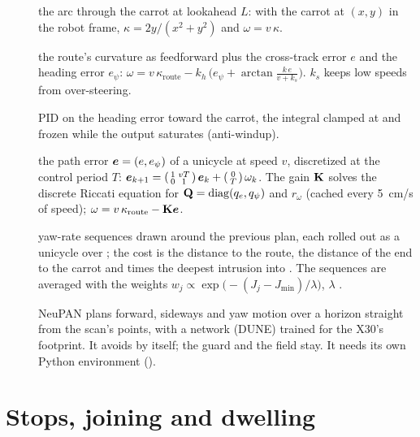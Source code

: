 \begin{description}
  \item[] the arc through the carrot at lookahead $L$: with the carrot at $(x,
    y)$ in the robot frame, $\kappa = 2y/(x^2 + y^2)$ and $\omega = v\,\kappa$.
  \item[] the route's curvature as feedforward plus the cross-track error $e$ and the
    heading error $e_\psi$:
    $\omega = v\,\kappa_{\text{route}} - k_h\,\bigl(e_\psi + \arctan\frac{k\,e}{v + k_s}\bigr)$.
    $k_s$ keeps low speeds from over-steering.
  \item[] PID on the heading error toward the carrot, the integral clamped at
     and frozen while the output saturates (anti-windup).
  \item[] the path error $\boldsymbol{e} = (e, e_\psi)$ of a unicycle at speed $v$, discretized
    at the control period $T$: $\boldsymbol{e}_{k+1} = \left(\begin{smallmatrix}1 & vT\\0 & 1\end{smallmatrix}\right)
    \boldsymbol{e}_k + \left(\begin{smallmatrix}0\\T\end{smallmatrix}\right)\omega_k$. The gain $\mathbf{K}$ solves the
    discrete Riccati equation for $\mathbf{Q} = \operatorname{diag}(q_e, q_\psi)$ and $r_\omega$ (cached
    every \SI{5}{cm/s} of speed); $\omega = v\,\kappa_{\text{route}} - \mathbf{K}\boldsymbol{e}$.
  \item[]  yaw-rate sequences drawn around the previous plan, each rolled
    out as a unicycle over ; the cost is the distance to the route, the
    distance of the end to the carrot and  times the deepest intrusion
    into . The sequences are averaged with the weights
    $w_j \propto \exp\!\bigl(-(J_j - J_{\min})/\lambda\bigr)$, $\lambda$ .
  \item[] NeuPAN plans forward, sideways and yaw motion over a horizon straight from
    the scan's points, with a network (DUNE) trained for the X30's footprint. It avoids by itself;
    the guard and the field stay. It needs its own Python environment
    ().
\end{description}

\section{Stops, joining and dwelling}

